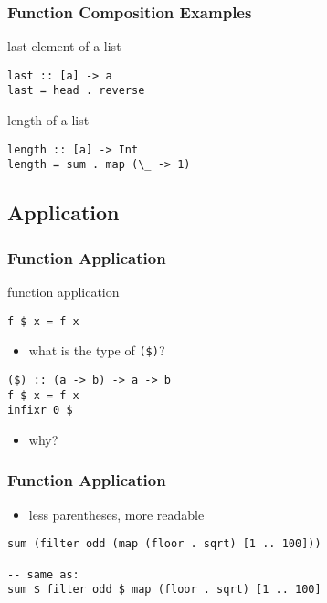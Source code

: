 \documentclass[dvipsnames]{beamer}
\theoremstyle{plain}
\begin{document}
\begin{frame}[fragile]
  \frametitle{Function Composition Examples}

  \begin{exampleblock}{last element of a list}
    \begin{lstlisting}[deletekeywords=last]
last :: [a] -> a
last = head . reverse
    \end{lstlisting}
  \end{exampleblock}

  \pause
  \begin{exampleblock}{length of a list}
    \begin{lstlisting}[deletekeywords=length]
length :: [a] -> Int
length = sum . map (\_ -> 1)
    \end{lstlisting}
  \end{exampleblock}
\end{frame}

\subsection{Application}

\begin{frame}[fragile]
  \frametitle{Function Application}

  \begin{block}{function application}
    \begin{lstlisting}
f $ x = f x
    \end{lstlisting}
  \end{block}

  \pause
  \begin{itemize}
    \item what is the type of \lstinline|($)|?
  \end{itemize}

  \begin{exampleblock}{}
    \begin{lstlisting}
($) :: (a -> b) -> a -> b
f $ x = f x
infixr 0 $
    \end{lstlisting}
  \end{exampleblock}

  \pause
  \begin{itemize}
    \item why?
  \end{itemize}
\end{frame}

\begin{frame}[fragile]
  \frametitle{Function Application}

  \begin{itemize}
    \item less parentheses, more readable
  \end{itemize}

  \begin{exampleblock}{}
    \begin{lstlisting}
sum (filter odd (map (floor . sqrt) [1 .. 100]))

-- same as:
sum $ filter odd $ map (floor . sqrt) [1 .. 100]
    \end{lstlisting}
  \end{exampleblock}
\end{frame}
\end{document}

